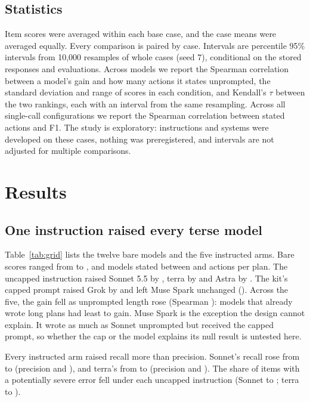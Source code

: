 \documentclass[11pt]{article}
\begin{document}
\subsection{Statistics}
\label{sec:statistics}
Item scores were averaged within each base case, and the \nCases{} case means were averaged equally.
Every comparison is paired by case. Intervals are percentile 95\% intervals from 10,000 resamples of
whole cases (seed 7), conditional on the stored responses and evaluations. Across models we report
the Spearman correlation between a model's gain and how many actions it states unprompted, the
standard deviation and range of scores in each condition, and Kendall's $\tau$ between the two
rankings, each with an interval from the same resampling. Across all single-call configurations we
report the Spearman correlation between stated actions and F1. The study is exploratory:
instructions and systems were developed on these cases, nothing was preregistered, and intervals
are not adjusted for multiple comparisons.

\section{Results}
\subsection{One instruction raised every terse model}
\label{sec:grid}
Table~\ref{tab:grid} lists the twelve bare models and the five instructed arms. Bare scores ranged
from \covFGrokBare{} to \covFSonnetBare{}, and models stated between \covAGrokBare{} and
\covAMuseBare{} actions per plan. The uncapped instruction raised Sonnet 5.5 by \covDPromptSonnet{},
terra by \covDPromptTerra{} and Astra by \covDPromptAstraExh{}. The kit's capped prompt raised Grok by
\covDPromptGrokThorough{} and left Muse Spark unchanged (\covDPromptMuseThorough{}). Across the five,
the gain fell as unprompted length rose (Spearman \covPaperGridRhoGainActions{}
\covPaperGridRhoGainActionsCI{}): models that already wrote long plans had least to gain. Muse Spark
is the exception the design cannot explain. It wrote as much as Sonnet unprompted but received the
capped prompt, so whether the cap or the model explains its null result is untested here.

Every instructed arm raised recall more than precision. Sonnet's recall rose from \covRSonnetBare{}
to \covRSonnetSpec{} (precision \covPSonnetBare{} and \covPSonnetSpec{}), and terra's from
\covRTerraBare{} to \covRTerraSpec{} (precision \covPTerraBare{} and \covPTerraSpec{}). The share of
items with a potentially severe error fell under each uncapped instruction (Sonnet \covSSonnetBare{}
to \covSSonnetSpec{}; terra \covSTerraBare{} to \covSTerraSpec{}).
\end{document}
